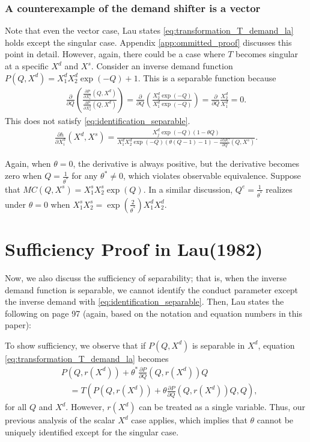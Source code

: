 \documentclass[11pt, a4paper]{article}
\theoremstyle{remark}
\begin{document}
\subsubsection{A counterexample of the demand shifter is a vector}\label{sec:counterexample_lau_vector}
Note that even the vector case, Lau states \eqref{eq:transformation_T_demand_la} holds except the singular case.
Appendix \ref{app:ommitted_proof} discusses this point in detail.
However, again, there could be a case where $T$ becomes singular at a specific $X^{d}$ and $X^{s}$.
Consider an inverse demand function $P(Q,X^{d}) = X^{d}_1 X^{d}_2\exp(-Q) + 1$.
This is a separable function because
\begin{align}
    \frac{\partial}{\partial Q}\left(\frac{\frac{\partial P}{\partial X^{d}_{1}}(Q, X^{d})}{\frac{\partial P}{\partial X^{d}_{2}}(Q, X^{d})}\right) = \frac{\partial}{\partial Q}\left(\frac{X^{d}_2\exp(-Q)}{X^{d}_1\exp(-Q)}\right) = \frac{\partial}{\partial Q} \frac{X^{d}_2}{X^{d}_1} = 0.
\end{align}
This does not satisfy \eqref{eq:identification_separable}.
\begin{align}
    \frac{\partial h}{\partial X^{d}_{i}}(X^{d}, X^{s}) = \frac{X_j^{d}\exp(-Q)(1-\theta Q)}{X_1^{d}X_2^{d}\exp(-Q)(\theta(Q- 1) -1) - \frac{\partial MC}{\partial Q}(Q, X^{s})}.
\end{align}

Again, when $\theta =0$, the derivative is always positive, but the derivative becomes zero when $Q = \frac{1}{\theta^{*}}$ for any $\theta^{*} \ne 0$, which violates observable equivalence.
Suppose that $MC(Q, X^{s}) = X^{s}_1X^{s}_2\exp(Q)$.
In a similar discussion, $Q^e = \frac{1}{\theta^{*}}$ realizes under $\theta = 0$ when $X^{s}_1X^{s}_2 = \exp\left(\frac{2}{\theta^*}\right) X^{d}_1 X^{d}_2$.

\section{Sufficiency Proof in Lau(1982)}\label{sec:proof_lau_sufficiency}
Now, we also discuss the sufficiency of separability; that is, when the inverse demand function is separable, we cannot identify the conduct parameter except the inverse demand with \eqref{eq:identification_separable}.
Then, Lau states the following on page 97 (again, based on the notation and equation numbers in this paper):
\begin{framed}
To show sufficiency, we observe that if $P(Q, X^{d})$ is separable in $X^{d}$, equation \eqref{eq:transformation_T_demand_la} becomes 
\begin{align}
    & P(Q, r(X^{d})) + \theta^* \frac{\partial P}{\partial Q} (Q, r(X^{d})) Q \\
    &\quad = T \left( P(Q, r(X^{d})) + \theta \frac{\partial P}{\partial Q} (Q, r(X^{d})) Q, Q \right), \label{eq:sufficiency_transform_p}
\end{align}
for all $Q$ and $ X^{d}$.
However, $r(X^{d})$ can be treated as a single variable. Thus, our previous analysis of the scalar $X^{d}$ case applies, which implies that $\theta$ cannot be uniquely identified except for the singular case.
\end{framed}
\end{document}

